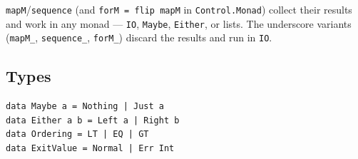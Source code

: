 \documentclass[11pt,a4paper]{article}
\begin{document}
\texttt{mapM}/\texttt{sequence} (and \texttt{forM = flip mapM} in
\texttt{Control.Monad}) collect their results and work in any monad ---
\texttt{IO}, \texttt{Maybe}, \texttt{Either}, or lists.  The
underscore variants (\texttt{mapM\_}, \texttt{sequence\_},
\texttt{forM\_}) discard the results and run in \texttt{IO}.

\subsection{Types}

\begin{lstlisting}
data Maybe a = Nothing | Just a
data Either a b = Left a | Right b
data Ordering = LT | EQ | GT
data ExitValue = Normal | Err Int
\end{lstlisting}
\end{document}
